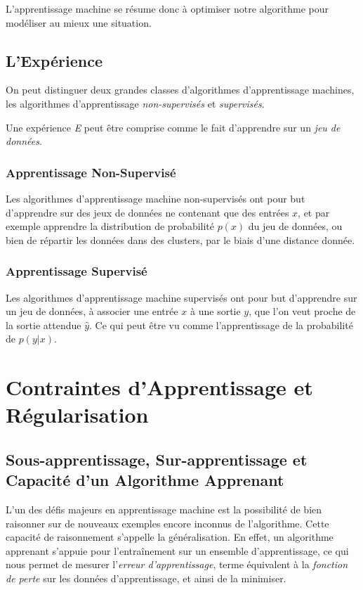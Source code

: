 \documentclass[a4paper, 11pt]{report}
\begin{document}
L'apprentissage machine se résume donc à optimiser notre algorithme pour modéliser au mieux une situation.
		
\subsection{L'Expérience}
On peut distinguer deux grandes classes d'algorithmes d'apprentissage machines, les algorithmes d'apprentissage \emph{non-supervisés} et \emph{supervisés}.

Une expérience \emph{E} peut être comprise comme le fait d'apprendre sur un \emph{jeu de données}.
\subsubsection{Apprentissage Non-Supervisé}
Les algorithmes d'apprentissage machine non-supervisés ont pour but d'apprendre sur des jeux de données ne contenant que des entrées $x$, et par exemple apprendre la distribution de probabilité $p(x)$ du jeu de données, ou bien de répartir les données dans des clusters, par le biais d'une distance donnée.
\subsubsection{Apprentissage Supervisé}
Les algorithmes d'apprentissage machine supervisés ont pour but d'apprendre sur un jeu de données, à associer une entrée $x$ à une sortie $y$, que l'on veut proche de la sortie attendue $\hat{y}$. Ce qui peut être vu comme l'apprentissage de la probabilité de $p(y|x)$.
	
\section{Contraintes d'Apprentissage et Régularisation}
\subsection{Sous-apprentissage, Sur-apprentissage et Capacité d'un Algorithme Apprenant}
L'un des défis majeurs en apprentissage machine est la possibilité de bien raisonner sur de nouveaux exemples encore inconnus de l'algorithme. Cette capacité de raisonnement s'appelle la généralisation.
En effet, un algorithme apprenant s'appuie pour l'entraînement sur un ensemble d'apprentissage, ce qui nous permet de mesurer l'\emph{erreur d'apprentissage}, terme équivalent à la \emph{fonction de perte} sur les données d'apprentissage, et ainsi de la minimiser.
\end{document}
